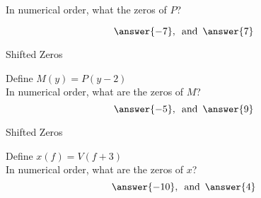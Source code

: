 \documentclass{ximera}
\begin{document}
\begin{exercise}
\begin{question}
In numerical order, what the zeros of $P$?

\[
\answer{-7}, \, \text{ and } \, \answer{7}
\]


\end{question}












\begin{question} Shifted Zeros 

Define $M(y) = P(y - 2)$ \\




In numerical order, what are the zeros of $M$? \\

\[
\answer{-5}, \, \text{ and } \, \answer{9}
\]

\end{question}















\begin{question} Shifted Zeros 

Define $x(f) = V(f + 3)$ \\



In numerical order, what are the zeros of $x$? \\

\[
\answer{-10}, \, \text{ and } \, \answer{4}
\]


\end{question}







\end{exercise}
\end{document}
